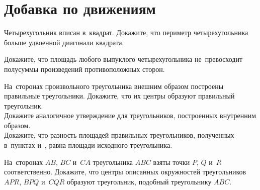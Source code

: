 
\section*{Добавка по движениям}


\begin{problems}

\item
Четырехугольник вписан в~квадрат.
Докажите, что периметр четырехугольника больше удвоенной диагонали квадрата.

\item
Докажите, что площадь любого выпуклого четырехугольника не~превосходит
полусуммы произведений противоположных сторон.

\item
\subproblem
\label{outrunning/geometry-plane-motion-more:napoleon-outward}%
На~сторонах произвольного треугольника внешним образом построены правильные
треугольники.
Докажите, что их центры образуют правильный треугольник.
\\
\subproblem
\label{outrunning/geometry-plane-motion-more:napoleon-inward}%
Докажите аналогичное утверждение для треугольников, построенных внутренним
образом.
\\
\subproblem
Докажите, что разность площадей правильных треугольников, полученных в~пунктах
и~,
равна площади исходного треугольника.

\item
На~сторонах $AB$, $BC$ и~$CA$ треугольника $ABC$ взяты точки $P$, $Q$ и~$R$
соответственно.
Докажите, что центры описанных окружностей треугольников $APR$, $BPQ$ и~$CQR$
образуют треугольник, подобный треугольнику $ABC$.

\end{problems}

